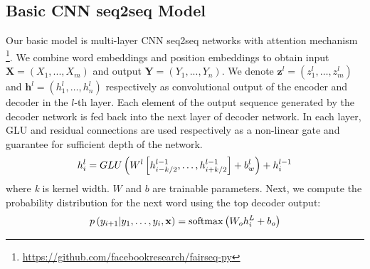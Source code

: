 \subsection{Basic CNN seq2seq Model}
\label{sec:basic}
Our basic model is multi-layer CNN seq2seq networks \cite{gehring2017convs2s} with attention mechanism
\footnote{\url{https://github.com/facebookresearch/fairseq-py}}.
We combine word embeddings and position embeddings to obtain input $\mathbf{X} = (X_1,...,X_m)$ and output $\mathbf{Y}=(Y_1,...,Y_n)$. 
We denote $\mathbf { z } ^ { l } = \left( z _ { 1 } ^ { l } , \ldots , z _ { m     } ^ { l } \right)$ and $\mathbf { h } ^ { l } = \left( h _ { 1 } ^ { l } , \ldots , h _ { n } ^ { l } \right)$ 
respectively as convolutional output of the encoder and
decoder in the $l$-th layer.
Each element of the output
sequence generated by the decoder network is fed
back into the next layer of decoder network.
In each layer, GLU \cite{DauphinFAG17} and residual connections \cite{HeZRS16}
are used respectively as a non-linear gate and guarantee for sufficient depth of the network.  
\begin{equation}
\small
    h _ { i } ^ { l } = GLU \left( W ^ { l } \left[ h _ {i-k/2 } ^ { l - 1 } , \ldots , h _ { i+k/2 } ^ { l - 1 } \right] + b _ { w } ^ { l } \right) + h _ { i } ^ { l - 1 }
\end{equation} 
where \textit{k} is kernel width. $W$ and $b$ are trainable parameters.
Next, we compute the probability distribution for the next word
using the top decoder output:
\begin{equation}
\small
    p \left( y _ { i + 1 } | y _ { 1 } , \ldots , y _ { i } , \mathbf { x } \right) = \operatorname { softmax } \left( W _ { o } h _ { i } ^ { L } + b _ { o } \right)
\end{equation}

